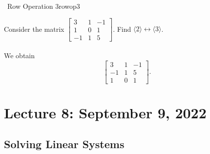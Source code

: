         \begin{example}{\Difficulty\,\Difficulty\,\,Row Operation 3}{rowop3}
        
            Consider the matrix \(\begin{bmatrix} 3 & 1 & -1 \\ 1 & 0 & 1 \\ -1 & 1 & 5 \end{bmatrix}\). Find \(\langle 2\rangle\leftrightarrow\langle 3\rangle\).
            \\
            \\
            We obtain
            \begin{equation*}
                \begin{bmatrix}
                    3 & 1 & -1 \\
                    -1 & 1 & 5 \\
                    1 & 0 & 1
                \end{bmatrix}.
            \end{equation*}
    
        \end{example}
        
\pagebreak
        
\section{Lecture 8: September 9, 2022}

    \subsection{Solving Linear Systems}
    
